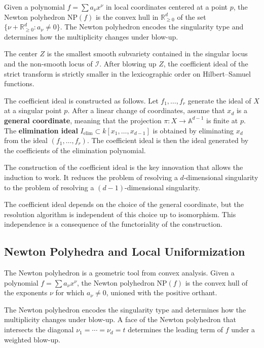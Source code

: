 Given a polynomial $f = \sum a_\nu x^\nu$ in local coordinates centered at a point $p$, the Newton polyhedron $\text{NP}(f)$ is the convex hull in $\mathbb{R}^d_{\geq 0}$ of the set $\{\nu + \mathbb{R}^d_{\geq 0} : a_\nu \neq 0\}$. The Newton polyhedron encodes the singularity type and determines how the multiplicity changes under blow-up.

The center $Z$ is the smallest smooth subvariety contained in the singular locus and the non-smooth locus of $\mathcal{I}$. After blowing up $Z$, the coefficient ideal of the strict transform is strictly smaller in the lexicographic order on Hilbert--Samuel functions.

The coefficient ideal is constructed as follows. Let $f_1, \ldots, f_r$ generate the ideal of $X$ at a singular point $p$. After a linear change of coordinates, assume that $x_d$ is a \textbf{general coordinate}, meaning that the projection $\pi: X \to \mathbb{A}^{d-1}$ is finite at $p$. The \textbf{elimination ideal} $I_{\text{elim}} \subset k[x_1, \ldots, x_{d-1}]$ is obtained by eliminating $x_d$ from the ideal $(f_1, \ldots, f_r)$. The coefficient ideal is then the ideal generated by the coefficients of the elimination polynomial.

The construction of the coefficient ideal is the key innovation that allows the induction to work. It reduces the problem of resolving a $d$-dimensional singularity to the problem of resolving a $(d-1)$-dimensional singularity.

The coefficient ideal depends on the choice of the general coordinate, but the resolution algorithm is independent of this choice up to isomorphism. This independence is a consequence of the functoriality of the construction.

\subsection*{Newton Polyhedra and Local Uniformization}

The Newton polyhedron is a geometric tool from convex analysis. Given a polynomial $f = \sum a_\nu x^\nu$, the Newton polyhedron $\text{NP}(f)$ is the convex hull of the exponents $\nu$ for which $a_\nu \neq 0$, unioned with the positive orthant.

The Newton polyhedron encodes the singularity type and determines how the multiplicity changes under blow-up. A face of the Newton polyhedron that intersects the diagonal $\nu_1 = \cdots = \nu_d = t$ determines the leading term of $f$ under a weighted blow-up.

